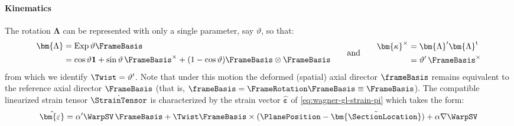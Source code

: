 \paragraph{Kinematics}
The rotation \(\bm{\Lambda}\)
can be represented with only a single parameter, say \(\vartheta\), so that:
\begin{equation}
\begin{aligned}
\bm{\Lambda} &= \operatorname{Exp} \vartheta \FrameBasis \\
&=\cos \vartheta \mathbf{1} + \sin \vartheta \, \FrameBasis^{\times} + (1-\cos \vartheta)  \FrameBasis \otimes \FrameBasis
\end{aligned}
\qquad\text{and}\qquad 
\begin{aligned}
\bm{\kappa}^{\times} &= \bm{\Lambda}^{\prime}\bm{\Lambda}^{\mathrm{t}} \\
&= \vartheta^{\prime} \, \FrameBasis^{\times}
\end{aligned}
\label{eq:rotation-field}
\end{equation}
from which we identify \(\Twist = \vartheta'\). 
Note that under this motion the deformed (spatial) axial director \(\frameBasis\) remains equivalent to the reference axial director \(\FrameBasis\) (that is, \(\frameBasis = \FrameRotation \FrameBasis \equiv \FrameBasis\)). 
The compatible linearized strain tensor \(\hat{\StrainTensor}\) is characterized by the strain vector \(\hat{\bm{\varepsilon}}\) of \eqref{eq:wagner-gl-strain-pi} which takes the form:
%
\begin{equation}
\begin{aligned}
\hat{\bm{\varepsilon}} 
&= \alpha' \WarpSV\,\FrameBasis + \Twist \FrameBasis \times (\PlanePosition-\tilde{\bm{\SectionLocation}}) + \alpha \nabla  \WarpSV \\
\end{aligned}
\label{eq:torsion-strain}
\end{equation}
%


